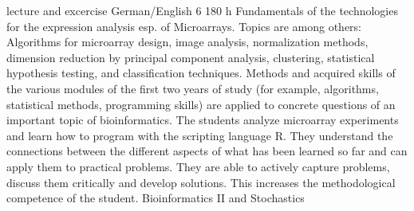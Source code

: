 {lecture and excercise}
{German/English}
{6}
{180 h}
{Fundamentals of the technologies for the expression analysis esp. of Microarrays. 
Topics are among others: Algorithms for microarray design, image analysis, normalization methods, dimension reduction by principal component analysis, clustering, statistical hypothesis testing, and classification techniques.}
{Methods and acquired skills of the various modules of the first two years of study (for example, algorithms, statistical methods, programming skills) are applied to concrete questions of an important topic of bioinformatics. 
The students analyze microarray experiments and learn how to program with the scripting language R.
They understand the connections between the different aspects of what has been learned so far and can apply them to practical problems.
They are able to actively capture problems, discuss them critically and develop solutions. This increases the methodological competence of the student.}
{Bioinformatics II and Stochastics}